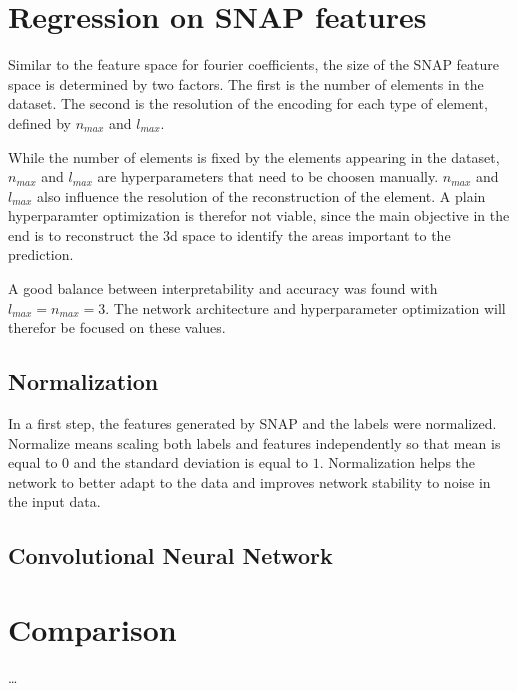 \section{Regression on SNAP features}
\label{sec:Evaluation:snap}

Similar to the feature space for fourier coefficients, the size of the SNAP feature space is determined by two factors.
The first is the number of elements in the dataset.
The second is the resolution of the encoding for each type of element, defined by $n_{max}$ and $l_{max}$.

While the number of elements is fixed by the elements appearing in the dataset, $n_{max}$ and $l_{max}$ are hyperparameters that need to be choosen manually.
$n_{max}$ and $l_{max}$ also influence the resolution of the reconstruction of the element.
A plain hyperparamter optimization is therefor not viable, since the main objective in the end
is to reconstruct the 3d space to identify the areas important to the prediction.

A good balance between interpretability and accuracy was found with $l_{max}=n_{max}=3$. 
The network architecture and hyperparameter optimization will therefor be focused on these values.

\subsection{Normalization}

In a first step, the features generated by SNAP and the labels were normalized.
Normalize means scaling both labels and features independently so that mean is equal to $0$ and the standard deviation is equal to $1$.
Normalization helps the network to better adapt to the data and improves network stability to noise in the input data.

\subsection{Convolutional Neural Network}



\section{Comparison}
\label{sec:Evaluation:Comparison}

\dots

